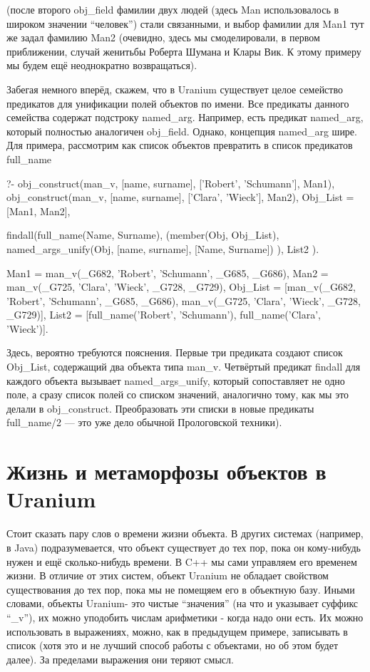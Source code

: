 \documentclass[a4paper]{book}
\def\ur{Uranium}
\begin{document}
(после второго obj\_field фамилии двух людей (здесь Man
использовалось в широком значении ``человек'') стали связанными,
и выбор фамилии для Man1 тут же задал фамилию Man2 (очевидно,
здесь мы смоделировали, в первом приближении, случай женитьбы
Роберта Шумана и Клары Вик. К этому примеру мы будем ещё
неоднократно возвращаться).

Забегая немного вперёд, скажем, что в \ur{} существует целое
семейство предикатов для унификации полей объектов по имени. Все
предикаты данного семейства содержат подстроку
named\_arg. Например, есть предикат named\_arg, который полностью
аналогичен obj\_field. Однако, концепция named\_arg шире. Для
примера, рассмотрим как список объектов превратить в список
предикатов full\_name

\begin{bigexample}{}{}
?- obj_construct(man_v, [name, surname], ['Robert', 'Schumann'],
                 Man1), 
   obj_construct(man_v, [name, surname], ['Clara', 'Wieck'],
                 Man2),
   Obj_List = [Man1, Man2], 

   findall(full_name(Name, Surname), 
           (member(Obj, Obj_List), 
            named_args_unify(Obj, [name, surname], 
                                  [Name, Surname])
            ), 
           List2
           ).

Man1 = man_v(_G682, 'Robert', 'Schumann', _G685, _G686),
Man2 = man_v(_G725, 'Clara', 'Wieck', _G728, _G729),
Obj_List = [man_v(_G682, 'Robert', 'Schumann', _G685, _G686), 
            man_v(_G725, 'Clara', 'Wieck', _G728, _G729)],
List2 = [full_name('Robert', 'Schumann'), 
         full_name('Clara', 'Wieck')].
\end{bigexample}

Здесь, вероятно требуются пояснения.  Первые три предиката
создают список Obj\_List, содержащий два объекта типа
man\_v. Четвёртый предикат findall для каждого объекта вызывает
named\_args\_unify, который сопоставляет не одно поле, а сразу
список полей со списком значений, аналогично тому, как мы это
делали в obj\_construct. Преобразовать эти списки в новые
предикаты full\_name/2 --- это уже дело обычной Прологовской
техники).

\section{Жизнь и метаморфозы объектов в \ur}

Стоит сказать пару слов о времени жизни объекта. В других
системах (например, в Java) подразумевается, что объект
существует до тех пор, пока он кому-нибудь нужен и ещё
сколько-нибудь времени. В C++ мы сами управляем его временем
жизни. В отличие от этих систем, объект \ur{} не обладает
свойством существования до тех пор, пока мы не помещяем его в
объектную базу. Иными словами, объекты \ur - это чистые
``значения'' (на что и указывает суффикс ``\_v''), их можно
уподобить числам арифметики - когда надо они есть. Их можно
использовать в выражениях, можно, как в предыдущем примере,
записывать в список (хотя это и не лучший способ работы с
объектами, но об этом будет далее). За пределами выражения они
теряют смысл.
\end{document}
